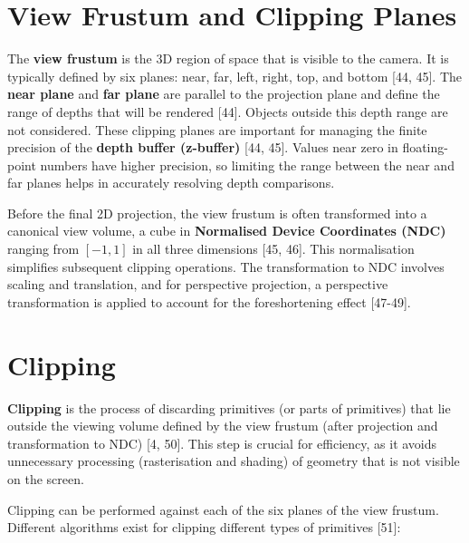 \documentclass[12pt]{article}
\begin{document}
\section{View Frustum and Clipping Planes}

The \textbf{view frustum} is the 3D region of space that is visible to the camera. It is typically defined by six planes: near, far, left, right, top, and bottom [44, 45]. The \textbf{near plane} and \textbf{far plane} are parallel to the projection plane and define the range of depths that will be rendered [44]. Objects outside this depth range are not considered. These clipping planes are important for managing the finite precision of the \textbf{depth buffer (z-buffer)} [44, 45]. Values near zero in floating-point numbers have higher precision, so limiting the range between the near and far planes helps in accurately resolving depth comparisons.

Before the final 2D projection, the view frustum is often transformed into a canonical view volume, a cube in \textbf{Normalised Device Coordinates (NDC)} ranging from $[-1, 1]$ in all three dimensions [45, 46]. This normalisation simplifies subsequent clipping operations. The transformation to NDC involves scaling and translation, and for perspective projection, a perspective transformation is applied to account for the foreshortening effect [47-49].

\section{Clipping}

\textbf{Clipping} is the process of discarding primitives (or parts of primitives) that lie outside the viewing volume defined by the view frustum (after projection and transformation to NDC) [4, 50]. This step is crucial for efficiency, as it avoids unnecessary processing (rasterisation and shading) of geometry that is not visible on the screen.

Clipping can be performed against each of the six planes of the view frustum. Different algorithms exist for clipping different types of primitives [51]:
\end{document}
